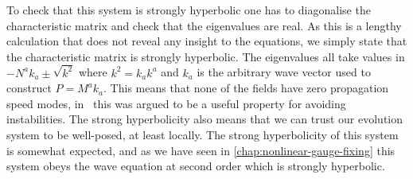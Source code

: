 \documentclass[10pt]{report}
\theoremstyle{definition}
\begin{document}
    To check that this system is strongly hyperbolic one has to diagonalise the characteristic matrix and check that the eigenvalues are real. As this is a lengthy calculation that does not reveal any insight to the equations, we simply state that the characteristic matrix is strongly hyperbolic. The eigenvalues all take values in $- N^a k_a \pm \sqrt{k^2}$ where $k^2 = k_a k^a$ and $k_a$ is the arbitrary wave vector used to construct $P = M^a k_a$. This means that none of the fields have zero propagation speed modes, in~\cite{Towards_an_unde_Alcubi_1999} this was argued to be a useful property for avoiding instabilities. The strong hyperbolicity also means that we can trust our evolution system to be well-posed, at least locally. The strong hyperbolicity of this system is somewhat expected, and as we have seen in \cref{chap:nonlinear-gauge-fixing} this system obeys the wave equation at second order which is strongly hyperbolic.
\end{document}
